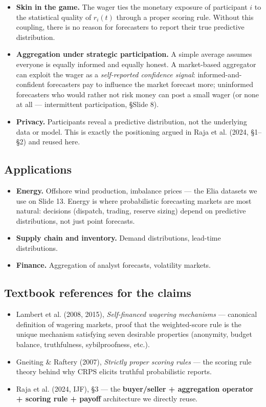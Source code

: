 \documentclass[11pt]{article}
\begin{document}
\begin{itemize}
\item \textbf{Skin in the game.} The wager ties the monetary exposure of participant $i$ to the statistical quality of $r_i(t)$ through a proper scoring rule. Without this coupling, there is no reason for forecasters to report their true predictive distribution.
\item \textbf{Aggregation under strategic participation.} A simple average assumes everyone is equally informed and equally honest. A market-based aggregator can exploit the wager as a \emph{self-reported confidence signal}: informed-and-confident forecasters pay to influence the market forecast more; uninformed forecasters who would rather not risk money can post a small wager (or none at all --- intermittent participation, \S Slide 8).
\item \textbf{Privacy.} Participants reveal a predictive distribution, not the underlying data or model. This is exactly the positioning argued in Raja et al. (2024, \S 1--\S 2) and reused here.
\end{itemize}

\subsection{Applications}


\begin{itemize}
\item \textbf{Energy.} Offshore wind production, imbalance prices --- the Elia datasets we use on Slide 13. Energy is where probabilistic forecasting markets are most natural: decisions (dispatch, trading, reserve sizing) depend on predictive distributions, not just point forecasts.
\item \textbf{Supply chain and inventory.} Demand distributions, lead-time distributions.
\item \textbf{Finance.} Aggregation of analyst forecasts, volatility markets.
\end{itemize}

\subsection{Textbook references for the claims}


\begin{itemize}
\item Lambert et al. (2008, 2015), \emph{Self-financed wagering mechanisms} --- canonical definition of wagering markets, proof that the weighted-score rule is the unique mechanism satisfying seven desirable properties (anonymity, budget balance, truthfulness, sybilproofness, etc.).
\item Gneiting \& Raftery (2007), \emph{Strictly proper scoring rules} --- the scoring rule theory behind why $\text{CRPS}$ elicits truthful probabilistic reports.
\item Raja et al. (2024, IJF), \S 3 --- the \textbf{buyer/seller + aggregation operator + scoring rule + payoff} architecture we directly reuse.
\end{itemize}
\end{document}
